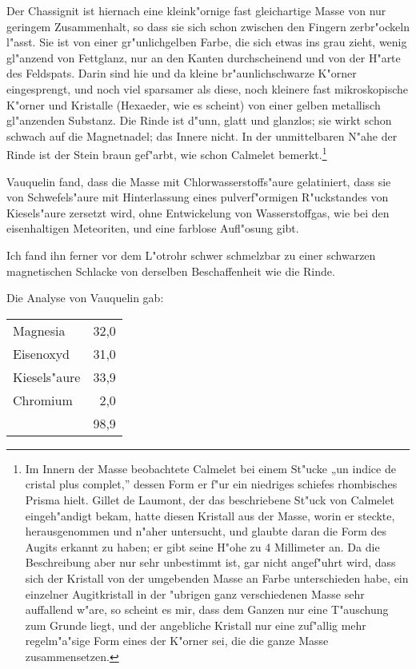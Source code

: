 \documentclass[a4paper, 11pt, oneside, german]{article}
\begin{document}
Der Chassignit ist hiernach eine kleink"ornige fast gleichartige Masse von nur geringem Zusammenhalt, so dass sie sich schon zwischen den Fingern zerbr"ockeln l"asst. Sie ist von einer gr"unlichgelben Farbe, die sich etwas ins grau zieht, wenig gl"anzend von Fettglanz, nur an den Kanten durchscheinend und von der H"arte des Feldspats. Darin sind hie und da kleine br"aunlichschwarze K"orner eingesprengt, und noch viel sparsamer als diese, noch kleinere fast mikroskopische K"orner und Kristalle (Hexaeder, wie es scheint) von einer gelben metallisch gl"anzenden Substanz. Die Rinde ist d"unn, glatt und glanzlos; sie wirkt schon schwach auf die Magnetnadel; das Innere nicht. In der unmittelbaren N"ahe der Rinde ist der Stein braun gef"arbt, wie schon Calmelet bemerkt.\footnote{Im Innern der Masse beobachtete Calmelet bei einem St"ucke „un indice de cristal plus complet,” dessen Form er f"ur ein niedriges schiefes rhombisches Prisma hielt. Gillet de Laumont, der das beschriebene St"uck von Calmelet eingeh"andigt bekam, hatte diesen Kristall aus der Masse, worin er steckte, herausgenommen und n"aher untersucht, und glaubte daran die Form des Augits erkannt zu haben; er gibt seine H"ohe zu 4 Millimeter an. Da die Beschreibung aber nur sehr unbestimmt ist, gar nicht angef"uhrt wird, dass sich der Kristall von der umgebenden Masse an Farbe unterschieden habe, ein einzelner Augitkristall in der "ubrigen ganz verschiedenen Masse sehr auffallend w"are, so scheint es mir, dass dem Ganzen nur eine T"auschung zum Grunde liegt, und der angebliche Kristall nur eine zuf"allig mehr regelm"a"sige Form eines der K"orner sei, die die ganze Masse zusammensetzen.}

Vauquelin fand, dass die Masse mit Chlorwasserstoffs"aure gelatiniert, dass sie von Schwefels"aure mit Hinterlassung eines pulverf"ormigen R"uckstandes von Kiesels"aure zersetzt wird, ohne Entwickelung von Wasserstoffgas, wie bei den eisenhaltigen Meteoriten, und eine farblose Aufl"osung gibt.

Ich fand ihn ferner vor dem L"otrohr schwer schmelzbar zu einer schwarzen magnetischen Schlacke von derselben Beschaffenheit wie die Rinde.

Die Analyse von Vauquelin gab:  
\begin{center}
\begin{tabular}{ l r }
    Magnesia & 32,0\\
    Eisenoxyd & 31,0\\
    Kiesels"aure & 33,9\\
    Chromium & 2,0\\
     & 98,9\\
\end{tabular}
\end{center}
\end{document}
